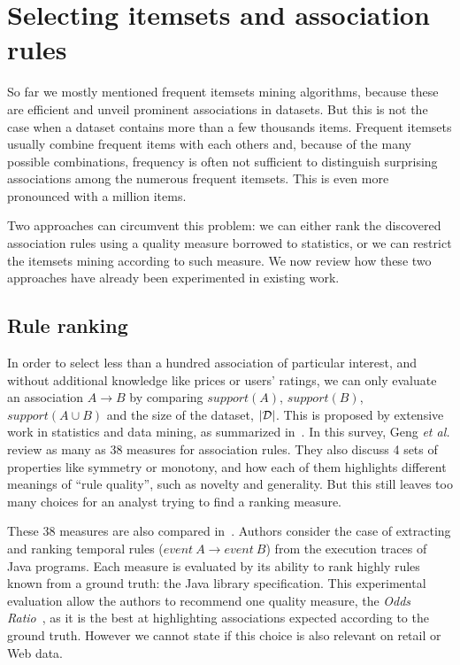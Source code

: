 \section{Selecting itemsets and association rules}
\label{sec:rel:selection}

So far we mostly mentioned frequent itemsets mining algorithms,
because these are efficient and
unveil prominent associations in datasets.
But this is not the case when a dataset contains more than a few thousands items.
Frequent itemsets usually combine frequent items with each others and,
because of the many possible combinations,
frequency is often not sufficient to distinguish surprising associations among the numerous frequent itemsets.
This is even more pronounced with a million items.

Two approaches can circumvent this problem:
we can either rank the discovered association rules
using a quality measure borrowed to statistics,
or we can restrict the itemsets mining according to such measure.
We now review how these two approaches have already been experimented in existing work.


\subsection{Rule ranking}
\label{sec:rel:capa}

In order to select less than a hundred association of particular interest,
and without additional knowledge like prices or users' ratings,
we can only evaluate an association $A \rightarrow B$ by comparing
$\mathit{support}(A)$, $\mathit{support}(B)$, $\mathit{support}(A \cup B)$
and the size of the dataset, $|\cal D|$.
This is proposed by extensive work in statistics and data mining,
as summarized in~\cite{GengACM06}.
In this survey, Geng \textit{et al.} review as many as 38 measures for association rules.
They also discuss 4 sets of properties like symmetry or monotony,
and how each of them highlights different meanings of ``rule quality'', such as novelty and generality.
But this still leaves too many choices for an analyst trying to find a ranking measure.


These 38 measures are also compared in~\cite{LeSANER15}.
Authors consider the case of extracting and ranking temporal rules ($\mathit{event\ A}\rightarrow\mathit{event\ B}$)
from the execution traces of Java programs.
Each measure is evaluated by its ability to rank highly rules known from a ground truth:
the Java library specification.
This experimental evaluation allow the authors to recommend one quality measure,
the {\em Odds Ratio}~\cite{McHughMB09},
as it is the best at highlighting associations expected according to the ground truth.
However we cannot state if this choice is also relevant on retail or Web data.

